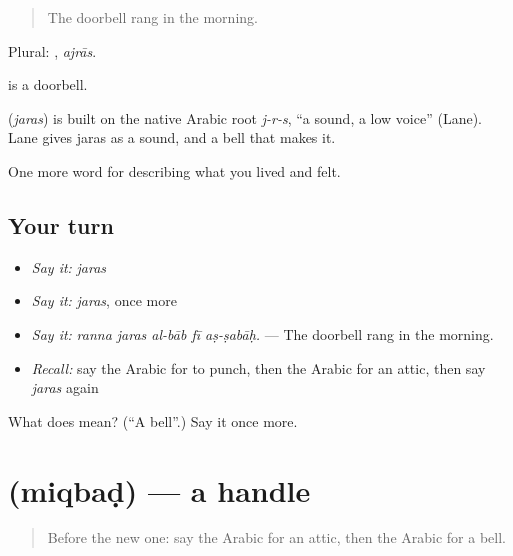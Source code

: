 \begin{quote}
The doorbell rang in the morning.
\end{quote}

Plural: , \emph{ajrās}.

  is a doorbell.

\begin{cousinweb}
\textbf{} (\emph{jaras}) is built on the native Arabic root \emph{j-r-s}, \textquotedblleft{}a sound, a low voice\textquotedblright{} (Lane). Lane gives jaras as a sound, and a bell that makes it.
\end{cousinweb}

\begin{grammarlens}[title={What you've built}]
One more word for describing what you lived and felt.
\end{grammarlens}

\subsection*{Your turn}
\begin{itemize}
\raggedright
  \item \emph{Say it:} \emph{jaras}
  \item \emph{Say it:} \emph{jaras}, once more
  \item \emph{Say it:} \emph{ranna jaras al-bāb fī aṣ-ṣabāḥ.} — The doorbell rang in the morning.
  \item \emph{Recall:} say the Arabic for to punch, then the Arabic for an attic, then say \emph{jaras} again
\end{itemize}

\begin{tcolorbox}[breakable,colback=teal!4,colframe=teal!35!black,title={Before you move on}]
What does  mean? (\textquotedblleft{}A bell\textquotedblright{}.) Say it once more.
\end{tcolorbox}
\section[\texorpdfstring{\ar{مقبض} (miqbaḍ)}{مقبض (miqbaḍ)}]{ (miqbaḍ) — a handle}

\label{lesson:AR-C549-miqbad}



\begin{quote}
Before the new one: say the Arabic for an attic, then the Arabic for a bell.
\end{quote}

